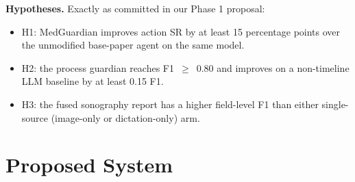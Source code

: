 \documentclass[conference]{IEEEtran}
\begin{document}
\textbf{Hypotheses.} Exactly as committed in our Phase 1 proposal:
\begin{itemize}
\item H1: MedGuardian improves action SR by at least 15 percentage points over the unmodified base-paper agent on the same model.
\item H2: the process guardian reaches F1~$\geq$~0.80 and improves on a non-timeline LLM baseline by at least 0.15 F1.
\item H3: the fused sonography report has a higher field-level F1 than either single-source (image-only or dictation-only) arm.
\end{itemize}

\section{Proposed System}\label{sec:system}
\end{document}
